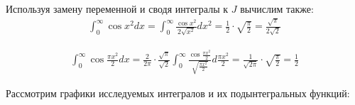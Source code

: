 \documentclass[12pt, a4paper]{article}
\begin{document}
Используя замену переменной и сводя интегралы к $J$ вычислим также:
\begin{equation*}
\begin{aligned}
\int_0^{\infty} \cos{x}^2 dx = \int_0^{\infty} \frac{\cos{x}^2}{2 \sqrt{x^2}} d x^2 = \frac{1}{2}\cdot \sqrt{\frac{\pi}{2}} = \frac{\sqrt{\pi}}{2\sqrt{2}}
\end{aligned}
\end{equation*}

\begin{equation*}
\begin{aligned}
\int_0^{\infty} \cos{\frac{\pi x^2}{2}} dx = \frac{2}{2\pi}\cdot \frac{\sqrt{\pi}}{\sqrt{2}}	\int_0^{\infty} \frac{\cos{\frac{\pi x^2}{2}}}{\sqrt{\frac{\pi x^2}{2}}} d \frac{\pi x^2}{2} = \frac{1}{\sqrt{2\pi}}\cdot \sqrt{\frac{\pi}{2}} = \frac{1}{2}
\end{aligned}
\end{equation*}

Рассмотрим графики исследуемых интегралов и их подынтегральных функций:
\end{document}

